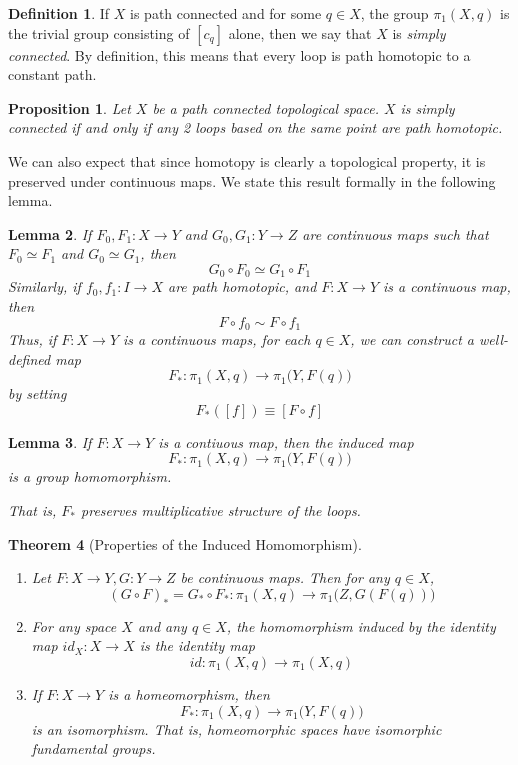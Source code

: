 \documentclass{article}
\newtheorem{theorem}{Theorem}[section]
\newtheorem{proposition}[theorem]{Proposition}
\newtheorem{lemma}[theorem]{Lemma}
\theoremstyle{remark}
\theoremstyle{definition}
\newtheorem{definition}{Definition}[section]
\begin{document}
\begin{definition}
If $X$ is path connected and for some $q \in X$, the group $\pi_1 (X, q)$ is the trivial group consisting of $[c_q]$ alone, then we say that $X$ is \textit{simply connected}. By definition, this means that every loop is path homotopic to a constant path. 
\end{definition}

\begin{proposition}
Let $X$ be a path connected topological space. $X$ is simply connected if and only if any 2 loops based on the same point are path homotopic. 
\end{proposition}

We can also expect that since homotopy is clearly a topological property, it is preserved under continuous maps. We state this result formally in the following lemma.

\begin{lemma}
If $F_0, F_1: X \longrightarrow Y$ and $G_0, G_1: Y \longrightarrow Z$ are continuous maps such that $F_0 \simeq F_1$ and $G_0 \simeq G_1$, then 
\[G_0 \circ F_0 \simeq G_1 \circ F_1\]
Similarly, if $f_0, f_1: I \longrightarrow X$ are path homotopic, and $F: X \longrightarrow Y$ is a continuous map, then 
\[F \circ f_0 \sim F \circ f_1\]
Thus, if $F: X \longrightarrow Y$ is a continuous maps, for each $q \in X$, we can construct a well-defined map
\[F_*: \pi_1 (X, q) \longrightarrow \pi_1 \big( Y, F(q)\big)\]
by setting
\[F_* ([f]) \equiv [F \circ f]\]
\end{lemma}

\begin{lemma}
If $F: X \longrightarrow Y$ is a contiuous map, then the induced map 
\[F_* : \pi_1(X, q) \longrightarrow \pi_1 \big( Y, F(q)\big)\]
is a group homomorphism. 
That is, $F_*$ preserves multiplicative structure of the loops. 
\end{lemma}

\begin{theorem}[Properties of the Induced Homomorphism]
\begin{enumerate}
    \item Let $F: X \longrightarrow Y, G: Y \longrightarrow Z$ be continuous maps. Then for any $q \in X$, 
    \[(G \circ F)_* = G_* \circ F_* : \pi_1 (X, q) \longrightarrow \pi_1 \big(Z, G(F(q))\big)\]
    \item For any space $X$ and any $q \in X$, the homomorphism induced by the identity map $id_X: X \longrightarrow X$ is the identity map 
    \[id: \pi_1 (X, q) \longrightarrow \pi_1 (X, q)\]
    \item If $F: X \longrightarrow Y$ is a homeomorphism, then 
    \[F_* : \pi_1 (X, q) \longrightarrow \pi_1\big( Y, F(q)\big)\]
    is an isomorphism. That is, homeomorphic spaces have isomorphic fundamental groups.  
\end{enumerate}
\end{theorem}
\end{document}
